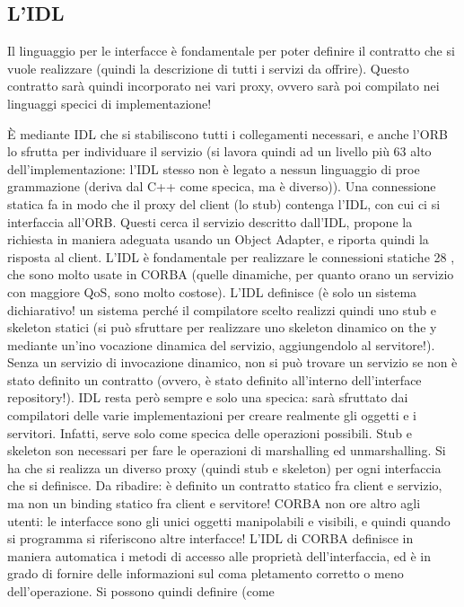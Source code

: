\subsection{L'IDL}
Il linguaggio per le interfacce è fondamentale per poter definire il contratto che
si vuole realizzare (quindi la descrizione di tutti i servizi da offrire). Questo
contratto sarà quindi incorporato nei vari proxy, ovvero sarà poi compilato nei
linguaggi specici di implementazione!

È mediante IDL che si stabiliscono tutti i collegamenti necessari, e anche
l'ORB lo sfrutta per individuare il servizio (si lavora quindi ad un livello più
63
alto dell'implementazione: l'IDL stesso non è legato a nessun linguaggio di proe
grammazione (deriva dal C++ come specica, ma è diverso)). Una connessione
statica fa in modo che il proxy del client (lo stub) contenga l'IDL, con cui ci
si interfaccia all'ORB. Questi cerca il servizio descritto dall'IDL, propone la
richiesta in maniera adeguata usando un Object Adapter, e riporta quindi la
risposta al client.
L'IDL è fondamentale per realizzare le connessioni statiche 28 , che sono molto
usate in CORBA (quelle dinamiche, per quanto orano un servizio con maggiore
QoS, sono molto costose). L'IDL definisce (è solo un sistema dichiarativo! un
sistema perché il compilatore scelto realizzi quindi uno stub e skeleton statici
(si può sfruttare per realizzare uno skeleton dinamico on the y mediante un'ino
vocazione dinamica del servizio, aggiungendolo al servitore!). Senza un servizio
di invocazione dinamico, non si può trovare un servizio se non è stato definito
un contratto (ovvero, è stato definito all'interno dell'interface repository!).
IDL resta però sempre e solo una specica: sarà sfruttato dai compilatori
delle varie implementazioni per creare realmente gli oggetti e i servitori. Infatti,
serve solo come specica delle operazioni possibili.
Stub e skeleton son necessari per fare le operazioni di marshalling ed unmarshalling. Si ha che si realizza un diverso
proxy (quindi stub e skeleton) per ogni
interfaccia che si definisce.
Da ribadire: è definito un contratto statico fra client e servizio, ma non un
binding statico fra client e servitore!
CORBA non ore altro agli utenti: le interfacce sono gli unici oggetti manipolabili e visibili, e quindi quando si
programma si riferiscono altre interfacce!
L'IDL di CORBA definisce in maniera automatica i metodi di accesso alle
proprietà dell'interfaccia, ed è in grado di fornire delle informazioni sul coma
pletamento corretto o meno dell'operazione. Si possono quindi definire (come
